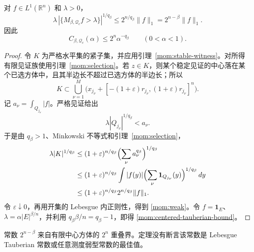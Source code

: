 \begin{theorem}[中心方体的分数弱型估计]\label{mom:centered-weak}
对 $f\in L^1(\mathbb R^n)$ 和 $\lambda>0$，
\begin{equation}
 \lambda\,|\{M_{\beta,\mathcal Q_c}f>\lambda\}|^{1/q_\beta}
 \le 2^{n/q_\beta}\|f\|_1=2^{n-\beta}\|f\|_1.
 \label{mom:weak}
\end{equation}
因此
\begin{equation}
 C_{\beta,\mathcal Q_c}(\alpha)\le 2^n\alpha^{-q_\beta}\qquad(0<\alpha<1).
 \label{mom:centered-tauberian-bound}
\end{equation}
\end{theorem}
\begin{proof}
令 $K$ 为严格水平集的紧子集，并应用引理~\ref{mom:stable-witness}。对所得有限见证族使用引理~\ref{mom:selection}。若 $z\in K$，则某个稳定见证的中心落在某个已选方体中，且其半边长不超过已选方体的半边长；所以
\[
 K\subset\bigcup_{\nu=1}^M\bigl(x_{j_\nu}+[-(1+\varepsilon)r_{j_\nu},(1+\varepsilon)r_{j_\nu}]^n\bigr).
\]
记 $a_\nu=\int_{Q_{j_\nu}}|f|$。严格见证给出
\[
 \lambda |Q_{j_\nu}|^{1/q_\beta}<a_\nu.
\]
于是由 $q_\beta>1$、Minkowski 不等式和引理~\ref{mom:selection}，
\[
 \begin{split}
 \lambda |K|^{1/q_\beta}
 &\le(1+\varepsilon)^{n/q_\beta}
 \Bigl(\sum_\nu a_\nu^{q_\beta}\Bigr)^{1/q_\beta}\\
 &\le(1+\varepsilon)^{n/q_\beta}
 \int |f(y)|\Bigl(\sum_\nu\mathbf1_{Q_{j_\nu}}(y)\Bigr)^{1/q_\beta}\,dy\\
 &\le(1+\varepsilon)^{n/q_\beta}2^{n/q_\beta}\|f\|_1.
 \end{split}
\]
令 $\varepsilon\downarrow0$，再用开集的 Lebesgue 内正则性，得到 \eqref{mom:weak}。令 $f=\mathbf1_E$、$\lambda=\alpha|E|^{\beta/n}$，并利用 $q_\beta\beta/n=q_\beta-1$，即得 \eqref{mom:centered-tauberian-bound}。
\end{proof}

\begin{remark}\label{mom:weak-scope}
常数 $2^{n-\beta}$ 来自有限中心方体的 $2^n$ 重叠界。定理没有断言该常数是 Lebesgue Tauberian 常数或任意测度弱型常数的最佳值。
\end{remark}

